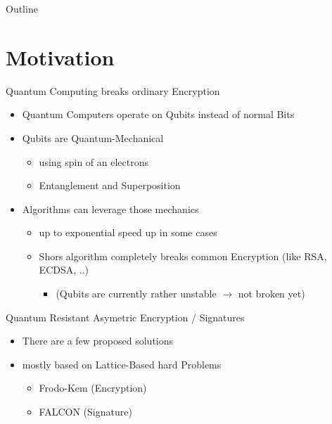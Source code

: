 \documentclass[ucs,10pt]{beamer}
\begin{document}
\begin{frame}[plain]
  \titlepage
\end{frame}

\begin{frame}{Outline}
  \tableofcontents
\end{frame}


\section{Motivation}

\begin{frame}{Quantum Computing breaks ordinary Encryption}
  \begin{itemize}
  \item
    Quantum Computers operate on Qubits instead of normal Bits
  \item
    Qubits are Quantum-Mechanical
    \begin{itemize}
      \item using spin of an electrons
      \item Entanglement and Superposition
    \end{itemize}
  \item
    Algorithms can leverage those mechanics
    \begin{itemize}
      \item up to exponential speed up in some cases
      \item Shors algorithm completely breaks common Encryption (like RSA, ECDSA, ..)
      \begin{itemize}
        \item (Qubits are currently rather unstable $\rightarrow$ not broken yet)
      \end{itemize}
    \end{itemize}
  \end{itemize}
\end{frame}

\begin{frame}{Quantum Resistant Asymetric Encryption / Signatures}

  \begin{itemize}
  \item There are a few proposed solutions
    
  \item mostly based on Lattice-Based hard Problems
    \begin{itemize}
    \item Frodo-Kem (Encryption)
    \item FALCON (Signature)
    \end{itemize}
   
  \end{itemize}
\end{frame}
\end{document}
